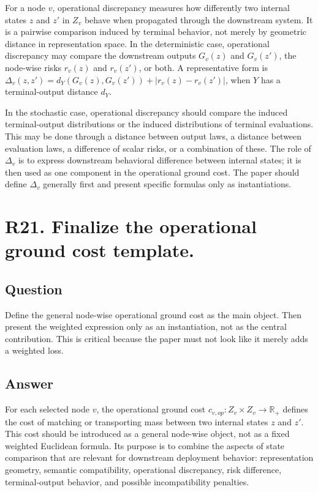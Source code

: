 \documentclass[11pt,a4paper]{article}
\begin{document}
For a node \(v\), operational discrepancy measures how differently two internal states \(z\) and \(z'\) in \(Z_v\) behave when propagated through the downstream system. It is a pairwise comparison induced by terminal behavior, not merely by geometric distance in representation space. In the deterministic case, operational discrepancy may compare the downstream outputs \(G_v(z)\) and \(G_v(z')\), the node-wise risks \(r_v(z)\) and \(r_v(z')\), or both. A representative form is \(\Delta_v(z,z') = d_Y(G_v(z),G_v(z')) + |r_v(z) - r_v(z')|\), when \(Y\) has a terminal-output distance \(d_Y\).

In the stochastic case, operational discrepancy should compare the induced terminal-output distributions or the induced distributions of terminal evaluations. This may be done through a distance between output laws, a distance between evaluation laws, a difference of scalar risks, or a combination of these. The role of \(\Delta_v\) is to express downstream behavioral difference between internal states; it is then used as one component in the operational ground cost. The paper should define \(\Delta_v\) generally first and present specific formulas only as instantiations.

\section*{R21. Finalize the operational ground cost template.}

\subsection*{Question}

Define the general node-wise operational ground cost as the main object. Then present the weighted expression only as an instantiation, not as the central contribution. This is critical because the paper must not look like it merely adds a weighted loss.

\subsection*{Answer}

For each selected node \(v\), the operational ground cost \(c_{v,op}: Z_v \times Z_v \to \mathbb{R}_+\) defines the cost of matching or transporting mass between two internal states \(z\) and \(z'\). This cost should be introduced as a general node-wise object, not as a fixed weighted Euclidean formula. Its purpose is to combine the aspects of state comparison that are relevant for downstream deployment behavior: representation geometry, semantic compatibility, operational discrepancy, risk difference, terminal-output behavior, and possible incompatibility penalties.
\end{document}
